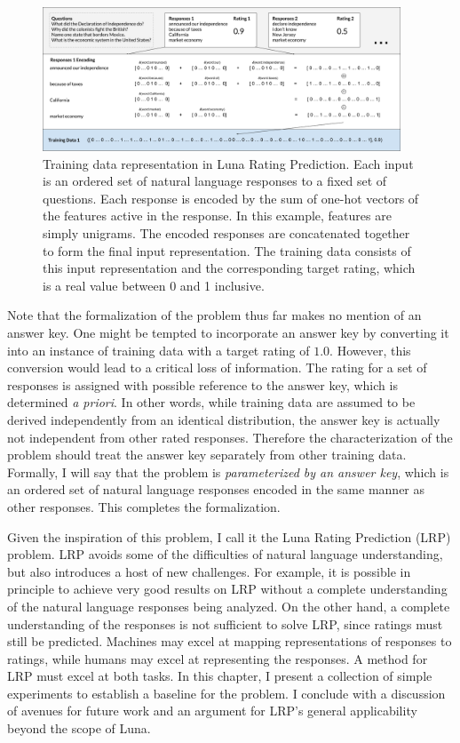 \begin{figure}[h]
\centerline{%
\includegraphics[width=0.95\textwidth]{figures/lrpformalization.png}%
}%
\caption{Training data representation in Luna Rating Prediction. Each input is an ordered set of natural language responses to a fixed set of questions. Each response is encoded by the sum of one-hot vectors of the features active in the response. In this example, features are simply unigrams. The encoded responses are concatenated together to form the final input representation. The training data consists of this input representation and the corresponding target rating, which is a real value between 0 and 1 inclusive.}
\label{fig:lrpformalization}
\end{figure}

Note that the formalization of the problem thus far makes no mention of an answer key. One might be tempted to incorporate an answer key by converting it into an instance of training data with a target rating of $1.0$. However, this conversion would lead to a critical loss of information. The rating for a set of responses is assigned with possible reference to the answer key, which is determined \textit{a priori}. In other words, while training data are assumed to be derived independently from an identical distribution, the answer key is actually not independent from other rated responses. Therefore the characterization of the problem should treat the answer key separately from other training data. Formally, I will say that the problem is \textit{parameterized by an answer key}, which is an ordered set of natural language responses encoded in the same manner as other responses. This completes the formalization.

Given the inspiration of this problem, I call it the Luna Rating Prediction (LRP) problem. LRP avoids some of the difficulties of natural language understanding, but also introduces a host of new challenges. For example, it is possible in principle to achieve very good results on LRP without a complete understanding of the natural language responses being analyzed. On the other hand, a complete understanding of the responses is not sufficient to solve LRP, since ratings must still be predicted. Machines may excel at mapping representations of responses to ratings, while humans may excel at representing the responses. A method for LRP must excel at both tasks. In this chapter, I present a collection of simple experiments to establish a baseline for the problem. I conclude with a discussion of avenues for future work and an argument for LRP's general applicability beyond the scope of Luna.

